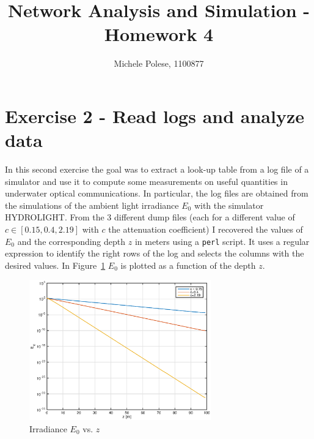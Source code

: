 \documentclass[10pt]{article}
\begin{document}
\title{Network Analysis and Simulation - Homework 4}
\author{Michele Polese, 1100877}

\maketitle

\section*{Exercise 2 - Read logs and analyze data}
In this second exercise the goal was to extract a look-up table from a log file of a simulator and use it to compute some measurements on useful quantities in underwater optical communications. In particular, the log files are obtained from the simulations of the ambient light irradiance $E_0$ with the simulator HYDROLIGHT. From the 3 different dump files (each for a different value of $c \in [0.15, 0.4, 2.19]$ with $c$ the attenuation coefficient) I recovered the values of $E_0$ and the corresponding depth $z$ in meters using a \texttt{perl} script. It uses a regular expression to identify the right rows of the log and selects the columns with the desired values. In Figure~\ref{fig:e0zm} $E_0$ is plotted as a function of the depth $z$.

\begin{figure}[h!]
	\centering
	\includegraphics[width = 0.7\textwidth]{e0_z}
	\caption{Irradiance $E_0$ vs. $z$}
	\label{fig:e0zm}
\end{figure}
\end{document}
